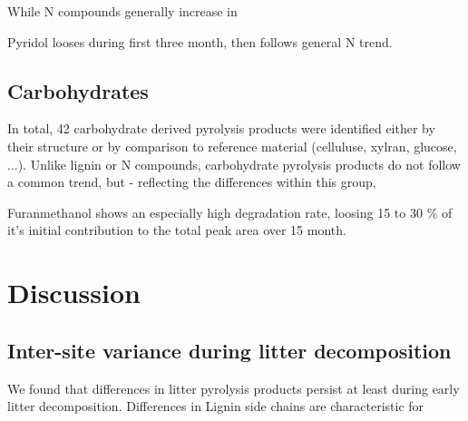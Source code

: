 \documentclass[preprint,review,12pt]{elsarticle}
\begin{document}
While N compounds generally increase in 

Pyridol looses during first three month, then follows general N trend.

\subsection{Carbohydrates}
In total, 42 carbohydrate derived pyrolysis products were identified either by their structure or by comparison to reference material (celluluse, xylran, glucose, ...). Unlike lignin or N compounds, carbohydrate pyrolysis products do not follow a common trend, but - reflecting the differences within this group, 

Furanmethanol shows an especially high degradation rate, loosing 15 to 30 \% of it's initial contribution to the total peak area over 15 month.

\section{Discussion}

\subsection{Inter-site variance during litter decomposition}
We found that differences in litter pyrolysis products persist at least during early litter decomposition. Differences in Lignin side chains are characteristic for 
\end{document}
